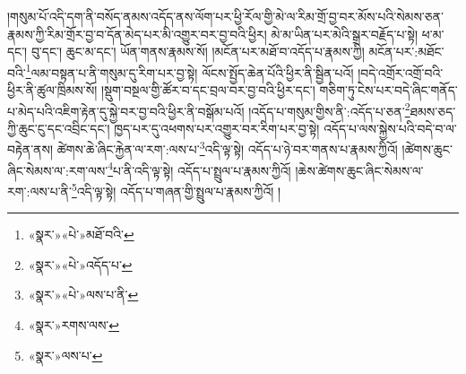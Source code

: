 །གསུམ་པོ་འདི་དག་ནི་བསོད་ནམས་འདོད་ནས་ལོག་པར་ཕྱི་རོལ་གྱི་མེ་ལ་རིམ་གྲོ་བྱ་བར་མོས་པའི་སེམས་ཅན་རྣམས་ཀྱི་རིམ་གྲོར་བྱ་བ་དོན་མེད་པར་མི་འགྱུར་བར་བྱ་བའི་ཕྱིར། མེ་མ་ཡིན་པར་མེའི་སྒྲར་བརྗོད་པ་སྟེ། ཕ་མ་དང་། བུ་དང་། ཆུང་མ་དང་། ཡོན་གནས་རྣམས་སོ། །མངོན་པར་མཐོ་བ་འདོད་པ་རྣམས་ཀྱི། མངོན་པར་:མཐོང་བའི་\footnote{«སྣར་»«པེ་»མཐོ་བའི་}ལམ་བསྟན་པ་ནི་གསུམ་དུ་རིག་པར་བྱ་སྟེ། ལོངས་སྤྱོད་ཆེན་པོའི་ཕྱིར་ནི་སྦྱིན་པའོ། །བདེ་འགྲོར་འགྲོ་བའི་ཕྱིར་ནི་ཚུལ་ཁྲིམས་སོ། །སྡུག་བསྔལ་གྱི་ཚོར་བ་དང་བྲལ་བར་བྱ་བའི་ཕྱིར་དང་། གཅིག་ཏུ་ངེས་པར་བདེ་ཞིང་གནོད་པ་མེད་པའི་འཇིག་རྟེན་དུ་སྐྱེ་བར་བྱ་བའི་ཕྱིར་ནི་བསྒོམ་པའོ། །འདོད་པ་གསུམ་གྱིས་ནི་:འདོད་པ་ཅན་\footnote{«སྣར་»«པེ་»འདོད་པ་}ཐམས་ཅད་ཀྱི་ཆུང་ངུ་དང་འབྲིང་དང་། ཁྱད་པར་དུ་འཕགས་པར་འགྱུར་བར་རིག་པར་བྱ་སྟེ། འདོད་པ་ལས་སྐྱེས་པའི་བདེ་བ་ལ་བརྟེན་ནས། ཚེགས་ཆེ་ཞིང་རྐྱེན་ལ་རག་:ལས་པ་\footnote{«སྣར་»«པེ་»ལས་པ་ནི་}འདི་ལྟ་སྟེ། འདོད་པ་ཉེ་བར་གནས་པ་རྣམས་ཀྱིའོ། །ཚེགས་ཆུང་ཞིང་སེམས་ལ་:རག་ལས་\footnote{«སྣར་»རགས་ལས་}པ་ནི་འདི་ལྟ་སྟེ། འདོད་པ་སྤྲུལ་པ་རྣམས་ཀྱིའོ། །ཆེས་ཚེགས་ཆུང་ཞིང་སེམས་ལ་རག་:ལས་པ་ནི་\footnote{«སྣར་»ལས་པ་}འདི་ལྟ་སྟེ། འདོད་པ་གཞན་གྱི་སྤྲུལ་པ་རྣམས་ཀྱིའོ། །
